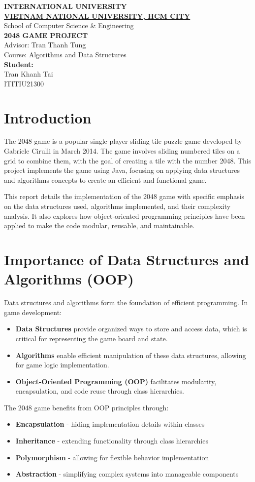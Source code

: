 \documentclass[12pt, a4paper]{article}
\newcommand{\titlepagetext}{
  \vspace*{1cm}
  \begin{center}
    {\Large\bfseries\textcolor{navyblue}{INTERNATIONAL UNIVERSITY}}\\[0.3cm]
    {\Large\bfseries\textcolor{navyblue}{\underline{VIETNAM NATIONAL UNIVERSITY, HCM CITY}}}\\[1cm]
    {\large\textcolor{navyblue}{School of Computer Science \& Engineering}}\\[2cm]
    
    {\LARGE\bfseries\textcolor{titlered}{2048 GAME PROJECT}}\\[2cm]
    
    {\large\textcolor{navyblue}{Advisor: Tran Thanh Tung}}\\[0.5cm]
    {\large\textcolor{navyblue}{Course: Algorithms and Data Structures}}\\[2cm]
    
    \large\textbf{\textcolor{navyblue}{Student:}}\\[1cm]
    \large\textcolor{navyblue}{Tran Khanh Tai}\\
    \large\textcolor{navyblue}{ITITIU21300}\\[1cm]
  \end{center}
}
\begin{document}
\begin{titlepage}
\thispagestyle{empty} %

\vspace{2cm}

\titlepagetext

\end{titlepage}

\tableofcontents
\newpage

\section{Introduction}
The 2048 game is a popular single-player sliding tile puzzle game developed by Gabriele Cirulli in March 2014. The game involves sliding numbered tiles on a grid to combine them, with the goal of creating a tile with the number 2048. This project implements the game using Java, focusing on applying data structures and algorithms concepts to create an efficient and functional game.

This report details the implementation of the 2048 game with specific emphasis on the data structures used, algorithms implemented, and their complexity analysis. It also explores how object-oriented programming principles have been applied to make the code modular, reusable, and maintainable.

\section{Importance of Data Structures and Algorithms (OOP)}
Data structures and algorithms form the foundation of efficient programming. In game development:

\begin{itemize}
    \item \textbf{Data Structures} provide organized ways to store and access data, which is critical for representing the game board and state.
    \item \textbf{Algorithms} enable efficient manipulation of these data structures, allowing for game logic implementation.
    \item \textbf{Object-Oriented Programming (OOP)} facilitates modularity, encapsulation, and code reuse through class hierarchies.
\end{itemize}

The 2048 game benefits from OOP principles through:
\begin{itemize}
    \item \textbf{Encapsulation} - hiding implementation details within classes
    \item \textbf{Inheritance} - extending functionality through class hierarchies
    \item \textbf{Polymorphism} - allowing for flexible behavior implementation
    \item \textbf{Abstraction} - simplifying complex systems into manageable components
\end{itemize}
\end{document}
